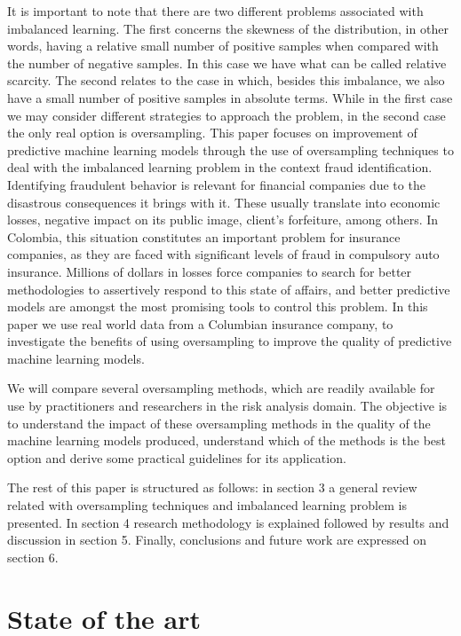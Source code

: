 \documentclass[parskip=full]{scrartcl}
\begin{document}
It is important to note that there are two different problems associated with
imbalanced learning. The first concerns the skewness of the distribution, in
other words, having a relative small number of positive samples when compared
with the number of negative samples. In this case we have what can be called
relative scarcity. The second relates to the case in which, besides this
imbalance, we also have a small number of positive samples in absolute terms.
While in the first case we may consider different strategies to approach the
problem, in the second case the only real option is oversampling. This paper
focuses on improvement of predictive machine learning models through the use of
oversampling techniques to deal with the imbalanced learning problem in the
context fraud identification. Identifying fraudulent behavior is relevant for
financial companies due to the disastrous consequences it brings with it. These
usually translate into economic losses, negative impact on its public image,
client’s forfeiture, among others. In Colombia, this situation constitutes an
important problem for insurance companies, as they are faced with significant
levels of fraud in compulsory auto insurance. Millions of dollars in losses
force companies to search for better methodologies to assertively respond to
this state of affairs, and better predictive models are amongst the most
promising tools to control this problem. In this paper we use real world data
from a Columbian insurance company, to investigate the benefits of using
oversampling to improve the quality of predictive machine learning models.

We will compare several oversampling methods, which are readily available for
use by practitioners and researchers in the risk analysis domain. The objective
is to understand the impact of these oversampling methods in the quality of the
machine learning models produced, understand which of the methods is the best
option and derive some practical guidelines for its application.

The rest of this paper is structured as follows: in section 3 a general review
related with oversampling techniques and imbalanced learning problem is
presented. In section 4 research methodology is explained followed by results
and discussion in section 5. Finally, conclusions and future work are expressed
on section 6.

\section{State of the art}
\end{document}
